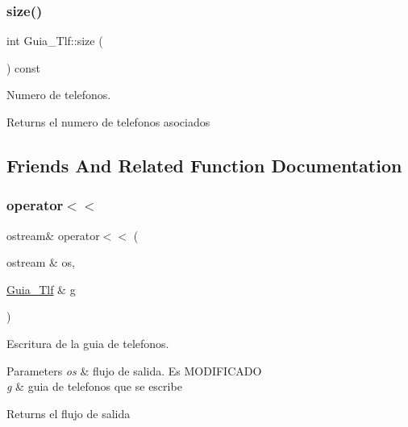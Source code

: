 \subsubsection{\texorpdfstring{size()}{size()}}
{\footnotesize\ttfamily int Guia\+\_\+\+Tlf\+::size (\begin{DoxyParamCaption}{ }\end{DoxyParamCaption}) const}



Numero de telefonos. 

\begin{DoxyReturn}{Returns}
el numero de telefonos asociados 
\end{DoxyReturn}


\subsection{Friends And Related Function Documentation}
\mbox{\label{classGuia__Tlf_a73eb02557f3118999710c66aa9ecf309}} 
\subsubsection{\texorpdfstring{operator$<$$<$}{operator<<}}
{\footnotesize\ttfamily ostream\& operator$<$$<$ (\begin{DoxyParamCaption}\item[{ostream \&}]{os,  }\item[{\mbox{\hyperlink{classGuia__Tlf}{Guia\+\_\+\+Tlf}} \&}]{g }\end{DoxyParamCaption})\hspace{0.3cm}{\ttfamily [friend]}}



Escritura de la guia de telefonos. 


\begin{DoxyParams}{Parameters}
{\em os} & flujo de salida. Es M\+O\+D\+I\+F\+I\+C\+A\+DO \\
\hline
{\em g} & guia de telefonos que se escribe \\
\hline
\end{DoxyParams}
\begin{DoxyReturn}{Returns}
el flujo de salida 
\end{DoxyReturn}
\mbox{\label{classGuia__Tlf_ac15a5b0c2eb7d5b1843f11beb492495e}} 
